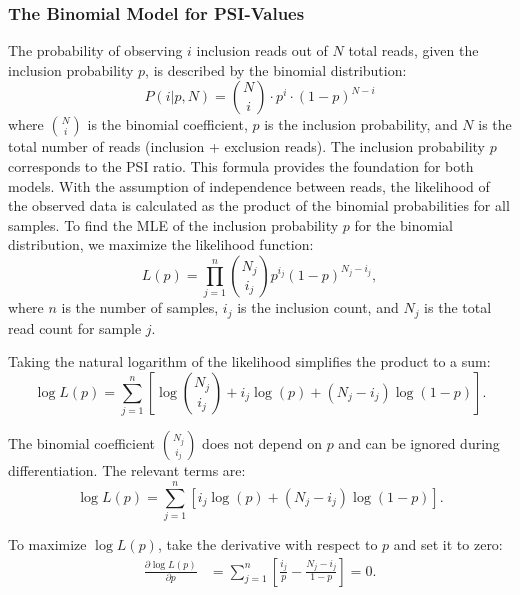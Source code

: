 \documentclass{article}
\begin{document}
    \subsubsection{The Binomial Model for PSI-Values}
    The probability of observing $i$ inclusion reads out of $N$ total reads, given the inclusion probability $p$, is described by the binomial distribution:
    \begin{equation}
        P(i|p,N) = \binom{N}{i} \cdot p^i \cdot (1-p)^{N-i}
        \label{eq:binomial-distribution}
    \end{equation}
    where \( \binom{N}{i} \) is the binomial coefficient, \( p \) is the inclusion probability, and \( N \) is the total number of reads (inclusion + exclusion reads). The inclusion probability \( p \) corresponds to the PSI ratio. This formula provides the foundation for both models. With the assumption of independence between reads, the likelihood of the observed data is calculated as the product of the binomial probabilities for all samples.
    To find the MLE of the inclusion probability \( p \) for the binomial distribution, we maximize the likelihood function:
    \begin{equation}
        L(p) = \prod_{j=1}^{n} \binom{N_j}{i_j} p^{i_j} (1-p)^{N_j - i_j},
    \end{equation}
    where \( n \) is the number of samples, \( i_j \) is the inclusion count, and \( N_j \) is the total read count for sample \( j \).

    Taking the natural logarithm of the likelihood simplifies the product to a sum:
    \begin{equation}
        \log L(p) = \sum_{j=1}^{n} \left[ \log \binom{N_j}{i_j} + i_j \log(p) + (N_j - i_j) \log(1-p) \right].
    \end{equation}

    The binomial coefficient \( \binom{N_j}{i_j} \) does not depend on \( p \) and can be ignored during differentiation. The relevant terms are:
    \begin{equation}
        \log L(p) = \sum_{j=1}^{n} \left[ i_j \log(p) + (N_j - i_j) \log(1-p) \right].
    \end{equation}

    To maximize \( \log L(p) \), take the derivative with respect to \( p \) and set it to zero:
    \begin{align}
        \frac{\partial \log L(p)}{\partial p} &= \sum_{j=1}^{n} \left[ \frac{i_j}{p} - \frac{N_j - i_j}{1-p} \right] = 0.
    \end{align}
\end{document}
